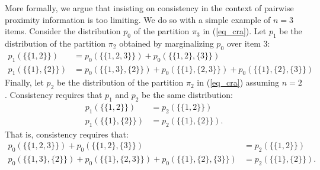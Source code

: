 \documentclass[lineno]{biometrika-dbd}
\newcommand{\partition}{\ensuremath{\pi}}
\begin{document}
More formally, we argue that insisting on consistency in the context of
pairwise proximity information is too limiting.  We do so with a simple example
of $n=3$ items.  Consider the distribution $p_0$ of the partition
$\partition_3$ in (\ref{eq_cra}).  Let $p_1$ be the distribution of the
partition $\partition_2$ obtained by marginalizing $p_0$ over item $3$:
\begin{align*}
p_1(\{\{1,2\}\}) & = p_0(\{\{1,2,3\}\}) + p_0(\{\{1,2\},\{3\}\}) \\
p_1(\{\{1\},\{2\}\}) & = p_0(\{\{1,3\},\{2\}\}) + p_0(\{\{1\},\{2,3\}\}) +
p_0(\{\{1\},\{2\},\{3\}\})
\end{align*}
Finally, let $p_2$ be the distribution
of the partition $\partition_2$ in (\ref{eq_cra}) assuming $n=2$.  Consistency
requires that $p_1$ and $p_2$ be the same distribution:
\begin{equation}
\label{eq_consistency}
\begin{split} p_1(\{\{1,2\}\}) & = p_2(\{\{1,2\}\}) \\
p_1(\{\{1\},\{2\}\}) & = p_2(\{\{1\},\{2\}\}).
\end{split}
\end{equation}
That is, consistency requires that:
\begin{equation}
\label{eq_consistencyfull}
\begin{split}
p_0(\{\{1,2,3\}\}) + p_0(\{\{1,2\},\{3\}\}) & = p_2(\{\{1,2\}\})
\\ p_0(\{\{1,3\},\{2\}\}) + p_0(\{\{1\},\{2,3\}\}) + p_0(\{\{1\},\{2\},\{3\}\})
& = p_2(\{\{1\},\{2\}\}).
\end{split}
\end{equation}
\end{document}

